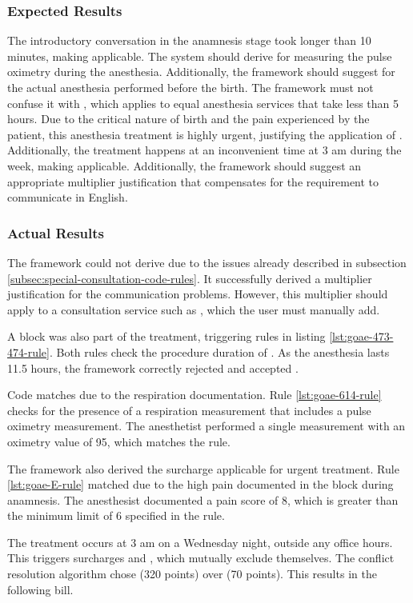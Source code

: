 \subsubsection{Expected Results}
The introductory conversation in the anamnesis stage took longer than 10 minutes, making  applicable.
The system should derive  for measuring the pulse oximetry during the anesthesia.
Additionally, the framework should suggest  for the actual anesthesia performed before the birth.
The framework must not confuse it with , which applies to equal anesthesia services that take less than 5 hours.
Due to the critical nature of birth and the pain experienced by the patient, this anesthesia treatment is highly urgent, justifying the application of .
Additionally, the treatment happens at an inconvenient time at 3 am during the week,
making  applicable.
Additionally, the framework should suggest an appropriate multiplier justification that compensates for the requirement to communicate in English.

\subsubsection{Actual Results}
The framework could not derive  due to the issues already described in subsection \ref{subsec:special-consultation-code-rules}.
It successfully derived a multiplier justification for the communication problems.
However, this multiplier should apply to a consultation service such as , which the user must manually add.

A  block was also part of the treatment, triggering rules in listing \ref{lst:goae-473-474-rule}.
Both rules check the procedure duration of .
As the anesthesia lasts 11.5 hours, the framework correctly rejected  and accepted .

Code  matches due to the respiration documentation.
Rule \ref{lst:goae-614-rule} checks for the presence of a respiration measurement that includes a pulse oximetry measurement.
The anesthetist performed a single measurement with an oximetry value of 95, which matches the rule.

The framework also derived the  surcharge applicable for urgent treatment.
Rule \ref{lst:goae-E-rule} matched due to the high pain documented in the  block during anamnesis.
The anesthesist documented a pain score of 8, which is greater than the minimum limit of 6 specified in the rule.

The treatment occurs at 3 am on a Wednesday night, outside any office hours.
This triggers surcharges  and , which mutually exclude themselves.
The conflict resolution algorithm chose  (320 points) over  (70 points).
This results in the following bill.



